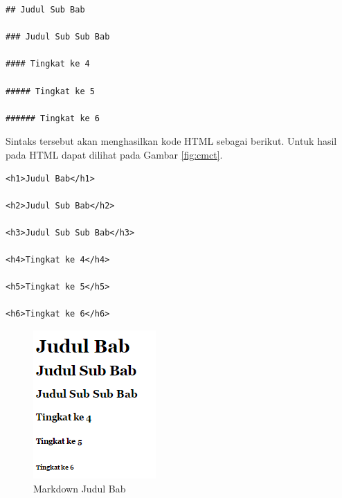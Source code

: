\begin{itemize}
\begin{itemize}
\begin{itemize}
\begin{lstlisting}[basicstyle=\footnotesize]
## Judul Sub Bab

### Judul Sub Sub Bab

#### Tingkat ke 4

##### Tingkat ke 5

###### Tingkat ke 6
\end{lstlisting}
Sintaks tersebut akan menghasilkan kode HTML sebagai berikut. Untuk hasil pada
HTML dapat dilihat pada Gambar \ref{fig:cmct}.
\begin{lstlisting}[basicstyle=\footnotesize]
<h1>Judul Bab</h1>

<h2>Judul Sub Bab</h2>

<h3>Judul Sub Sub Bab</h3>

<h4>Tingkat ke 4</h4>

<h5>Tingkat ke 5</h5>

<h6>Tingkat ke 6</h6>
\end{lstlisting}
\begin{figure}[H]
\centering
\includegraphics[scale=1]{Gambar/judulbab.png}
\caption[Markdown Judul Bab]{Markdown Judul Bab}
\label{fig:judulbab}
\end{figure}


\end{itemize}
\end{itemize}
\end{itemize}

